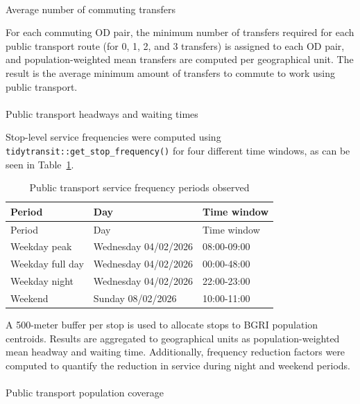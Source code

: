 \documentclass[
  authoryear,
  review,
  1p]{elsarticle}
\makeatletter
\let\oldparagraph\paragraph
\renewcommand{\paragraph}{
    \@ifstar
      \xxxParagraphStar
      \xxxParagraphNoStar
  }
\newcommand{\xxxParagraphStar}[1]{\oldparagraph*{#1}\mbox{}}
\newcommand{\xxxParagraphNoStar}[1]{\oldparagraph{#1}\mbox{}}
\makeatother
\begin{document}
\paragraph{Average number of commuting
transfers}\label{average-number-of-commuting-transfers}

For each commuting OD pair, the minimum number of transfers required for
each public transport route (for 0, 1, 2, and 3 transfers) is assigned
to each OD pair, and population-weighted mean transfers are computed per
geographical unit. The result is the average minimum amount of transfers
to commute to work using public transport.

\paragraph{Public transport headways and waiting
times}\label{public-transport-headways-and-waiting-times}

Stop-level service frequencies were computed using
\texttt{tidytransit::get\_stop\_frequency()} \citep{tidytransit} for
four different time windows, as can be seen in
Table~\ref{tbl-headway_periods}.

\begin{longtable}[]{@{}lll@{}}
\caption{Public transport service frequency periods
observed}\label{tbl-headway_periods}\tabularnewline
\toprule\noalign{}
Period & Day & Time window \\
\midrule\noalign{}
\endfirsthead
\toprule\noalign{}
Period & Day & Time window \\
\midrule\noalign{}
\endhead
\bottomrule\noalign{}
\endlastfoot
Weekday peak & Wednesday 04/02/2026 & 08:00-09:00 \\
Weekday full day & Wednesday 04/02/2026 & 00:00-48:00 \\
Weekday night & Wednesday 04/02/2026 & 22:00-23:00 \\
Weekend & Sunday 08/02/2026 & 10:00-11:00 \\
\end{longtable}

A 500-meter buffer per stop is used to allocate stops to BGRI
\citep{INE_Census2021} population centroids. Results are aggregated to
geographical units as population-weighted mean headway and waiting time.
Additionally, frequency reduction factors were computed to quantify the
reduction in service during night and weekend periods.

\paragraph{Public transport population
coverage}\label{public-transport-population-coverage}
\end{document}
